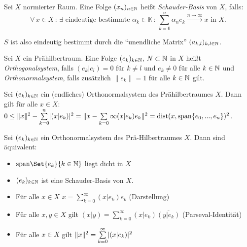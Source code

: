 \documentclass{cheat-sheet}
\newcommand{\K}{\mathbb{K}}
\newcommand{\dist}{\mathrm{dist}} %
\begin{document}
\begin{defn}
  Sei $X$ normierter Raum. Eine Folge $(x_n)_{n \in \mathbb{N}}$ heißt \emph{Schauder-Basis} von $X$, falls:
  \[ \forall \, x \in X \,:\, \exists \text{ eindeutige bestimmte } \alpha_k \in \K \,:\, \sum_{k=0}^n \alpha_n e_k \xrightarrow{n \to \infty} x \text{ in } X. \]
\end{defn}


$S$ ist also eindeutig bestimmt durch die "`unendliche Matrix"' $(a_{k,l})_{k,l \in \mathbb{N}}$.


\begin{defn}
  Sei $X$ ein Prähilbertraum. Eine Folge $(e_k)_{k \in \mathbb{N}}$, $N \subset \mathbb{N}$ in $X$ heißt \emph{Orthogonalsystem}, falls $(e_k | e_l) = 0$ für $k \not= l$ und $e_k \not= 0$ für alle $k \in \mathbb{N}$ und \emph{Orthonormalsystem}, falls zusätzlich $\|e_k\| = 1$ für alle $k \in \mathbb{N}$ gilt.
\end{defn}

\begin{lem}
  Sei $(e_k)_{k \in \mathbb{N}}$ ein (endliches) Orthonormalsystem des Prähilbertraumes $X$. Dann gilt für alle $x \in X$: $0 \leq \|x\|^2 - \sum_{k=0}^n \abs{(x|e_k)}^2 = \| x - \sum_{k=0}\infty (x | e_k) e_k \|^2 = \dist(x, \mathrm{span} \{ e_0, ..., e_n \})^2$.
\end{lem}

\begin{satz}
  Sei $(e_k)_{k \in \mathbb{N}}$ ein Orthonormalsystem des Prä-Hilbertraumes $X$. Dann sind äquivalent:
  \begin{itemize}
    \item $\mathrm{span} \Set{ e_k }{ k \in \N }$ liegt dicht in $X$
    \item $(e_k)_{k \in \mathbb{N}}$ ist eine Schauder-Basis von $X$.
    \item Für alle $x \in X$ $x = \sum_{k=0}^\infty (x | e_k) e_k$ (Darstellung)
    \item Für alle $x, y \in X$ gilt $(x|y) = \sum_{k=0}^\infty (x|e_k) \overline{(y|e_k)}$ (Parseval-Identität)
    \item Für alle $x \in X$ gilt $\| x \|^2 = \sum_{k=0}^\infty \abs{(x|e_k)}^2$
  \end{itemize}
\end{satz}
\end{document}
